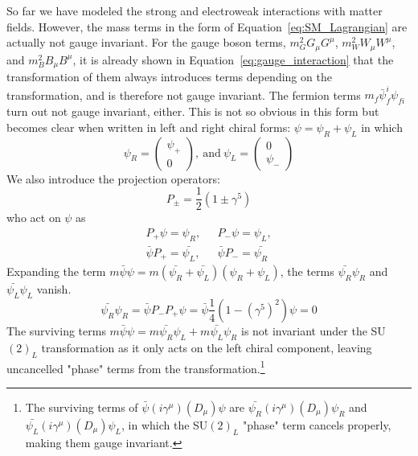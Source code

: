 So far we have modeled the strong and electroweak interactions with matter fields.
However, the mass terms in the form of Equation~\ref{eq:SM_Lagrangian} are actually not gauge invariant.
For the gauge boson terms, $m^{2}_{G} G_{\mu}G^{\mu}$, $m^{2}_{W} W_{\mu}W^{\mu}$, and $m^{2}_{B} B_{\mu}B^{\mu}$,
it is already shown in Equation~\ref{eq:gauge_interaction} that the transformation of them always introduces terms depending on the transformation,
and is therefore not gauge invariant.
The fermion terms $m_{f} \bar{\psi}^{i}_{f} \psi_{fi}$ turn out not gauge invariant, either.
This is not so obvious in this form but becomes clear when written in left and right chiral forms: $\psi = \psi_{R} + \psi_{L}$
in which 
\begin{equation}\label{eq:psi_chiral}
    \psi_{R} = \begin{pmatrix} \psi_{+} \\ 0 \end{pmatrix}, 
    ~\text{and}~
    \psi_{L} = \begin{pmatrix} 0 \\ \psi_{-} \end{pmatrix}
\end{equation}
We also introduce the projection operators:
\begin{equation}\label{eq:projection_op}
    P_{\pm} = \frac{1}{2}(1 \pm \gamma^{5})
\end{equation}
who act on $\psi$ as
\begin{equation}\label{eq:proj_psi}
  \begin{split}
    P_{+}\psi = \psi_{R}, & ~~~ P_{-}\psi = \psi_{L}, \\
    \bar{\psi}P_{+} = \bar{\psi_{L}}, & ~~~ \bar{\psi}P_{-} = \bar{\psi_{R}}
  \end{split}
\end{equation}
Expanding the term $m\bar{\psi} \psi = m(\bar{\psi_{R}} + \bar{\psi_{L}}) (\psi_{R} + \psi_{L})$,
the terms $\bar{\psi_{R}}\psi_{R}$ and $\bar{\psi_{L}}\psi_{L}$ vanish.
\begin{equation}\label{eq:RR_term}
    \bar{\psi_{R}}\psi_{R} = \bar{\psi} P_{-}P_{+} \psi = \bar{\psi} \frac{1}{4} (1 - (\gamma^{5})^{2}) \psi = 0
\end{equation}
The surviving terms $m\bar{\psi} \psi = m\bar{\psi_{R}}\psi_{L} + m\bar{\psi_{L}}\psi_{R}$
is not invariant under the SU$(2)_{L}$ transformation as it only acts on the left chiral component,
leaving uncancelled "phase" terms from the transformation.\footnote{The surviving terms of $\bar{\psi} (i\gamma^{\mu})(D_{\mu})\psi$
are $\bar{\psi_{R}} (i\gamma^{\mu})(D_{\mu})\psi_{R}$ and $\bar{\psi_{L}} (i\gamma^{\mu})(D_{\mu})\psi_{L}$, 
in which the SU$(2)_{L}$ "phase" term cancels properly, making them gauge invariant.}

